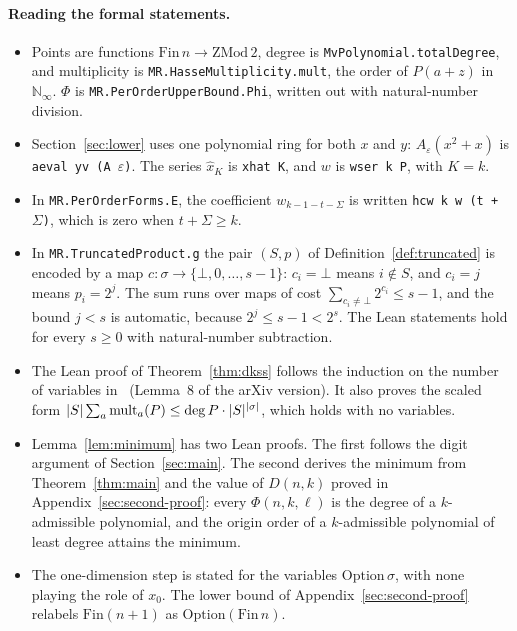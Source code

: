 \paragraph{Reading the formal statements.}
\begin{itemize}
 \item Points are functions \(\mathrm{Fin}\,n\to\mathrm{ZMod}\,2\), degree is
 \texttt{MvPolynomial.totalDegree}, and multiplicity is
 \nolinkurl{MR.HasseMultiplicity.mult}, the order of \(P(a+z)\) in
 \(\mathbb N_\infty\). \(\Phi\) is \nolinkurl{MR.PerOrderUpperBound.Phi}, written
 out with natural-number division.
 \item Section~\ref{sec:lower} uses one polynomial ring for both \(x\) and \(y\):
 \(A_\varepsilon(x^2+x)\) is \texttt{aeval yv (A }\(\varepsilon\)\texttt{)}. The
 series \(\hat x_K\) is \texttt{xhat K}, and \(w\) is \texttt{wser k P}, with \(K=k\).
 \item In \nolinkurl{MR.PerOrderForms.E}, the coefficient \(w_{k-1-t-\Sigma}\) is
 written \texttt{hcw k w (t + }\(\Sigma\)\texttt{)}, which is zero when
 \(t+\Sigma\ge k\).
 \item In \nolinkurl{MR.TruncatedProduct.g} the pair \((S,p)\) of
 Definition~\ref{def:truncated} is encoded by a map
 \(c:\sigma\to\{\bot,0,\ldots,s-1\}\): \(c_i=\bot\) means \(i\notin S\), and \(c_i=j\)
 means \(p_i=2^j\). The sum runs over maps of cost \(\sum_{c_i\ne\bot}2^{c_i}\le
 s-1\), and the bound \(j<s\) is automatic, because \(2^j\le s-1<2^s\). The Lean
 statements hold for every \(s\ge0\) with natural-number subtraction.
 \item The Lean proof of Theorem~\ref{thm:dkss} follows the induction on the
 number of variables in~\cite{DKSS13} (Lemma~8 of the arXiv version). It also
 proves the scaled form \(|S|\sum_a\operatorname{mult}_a(P)\le\deg P\cdot|S|^{|\sigma|}\), which
 holds with no variables.
 \item Lemma~\ref{lem:minimum} has two Lean proofs. The first follows the digit
 argument of Section~\ref{sec:main}. The second derives the minimum from
 Theorem~\ref{thm:main} and the value of \(D(n,k)\) proved in
 Appendix~\ref{sec:second-proof}: every \(\Phi(n,k,\ell)\) is the degree of a
 \(k\)-admissible polynomial, and the origin order of a \(k\)-admissible
 polynomial of least degree attains the minimum.
 \item The one-dimension step is stated for the variables
 \(\mathrm{Option}\,\sigma\), with \(\mathrm{none}\) playing the role of \(x_0\).
 The lower bound of Appendix~\ref{sec:second-proof} relabels
 \(\mathrm{Fin}(n+1)\) as \(\mathrm{Option}(\mathrm{Fin}\,n)\).
\end{itemize}

